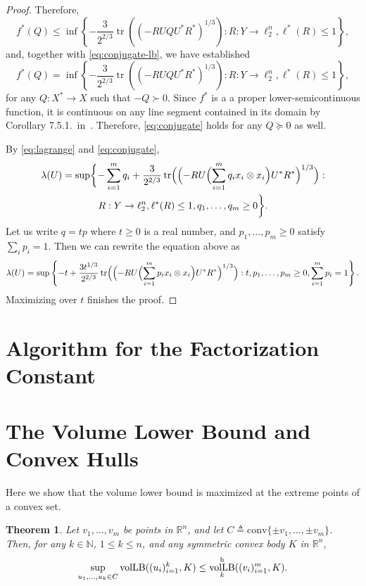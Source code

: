 \documentclass[11pt]{article}
\newtheorem{theorem}{Theorem}
\newcommand{\R}{{\mathbb{R}}}
\newcommand{\eqdef}{\triangleq}
\DeclareMathOperator{\vollb}{volLB}
\DeclareMathOperator{\tr}{tr}
\begin{document}
\begin{proof}
  Therefore,
  \[
    f^*(Q) \le
    \inf\left\{ -\frac{3}{2^{2/3}} \tr((-RUQU^*R^*)^{1/3}):
    R:Y \to \ell_2^n,\ell^*(R) \le 1\right\},
  \]
  and, together with \eqref{eq:conjugate-lb}, we have established 
  \begin{equation}
    \label{eq:conjugate}
    f^*(Q) =
    \inf\left\{ -\frac{3}{2^{2/3}} \tr((-RUQU^*R^*)^{1/3}):
    R:Y \to \ell_2^n,\ell^*(R) \le 1\right\},
  \end{equation}
  for any $Q:X^*\to X$ such that $-Q \succ 0$. Since $f^*$ is a
  a proper lower-semicontinuous function, it is continuous on any
  line segment contained in its domain by Corollary
  7.5.1.~in~\cite{Rockafellar}. Therefore, \eqref{eq:conjugate}
  holds for any $Q \succeq 0$ as well. 
  
  By \eqref{eq:lagrange} and \eqref{eq:conjugate}, 
  \begin{multline}
  \lambda(U) = 
  \sup \biggl\{-\sum_{i = 1}^m{q_i} 
  + \frac{3}{2^{2/3}} \tr\Bigl(\Bigl(-RU\Bigl(\sum_{i = 1}^m{q_i  x_i\otimes  x_i}\Bigr)U^*R^*\Bigr)^{1/3}\Bigr):\\
  R:Y \to \ell_2^n,\ell^*(R) \le 1,
  q_1, \ldots, q_m \ge 0\biggr\}.
  \end{multline}
  Let us write $q = tp$ where $t \ge 0$ is a real number, and $p_1,
  \ldots, p_m \ge 0$ satisfy $\sum_i p_i = 1$. Then we can rewrite the
  equation above as
  \[
  \lambda(U) = 
  \sup\left\{-t + 
    \frac{3t^{1/3}}{2^{2/3}} \tr\Bigl(\Bigl(-RU\Bigl(\sum_{i = 1}^m{p_i  x_i\otimes x_i}\Bigr)U^*R^*\Bigr)^{1/3}\Bigr):
    t, p_1, \ldots, p_m \ge 0, \sum_{i=1}^m p_i = 1\right\}.
  \]
  Maximizing over $t$ finishes the proof. 
\end{proof}

\section{Algorithm for the Factorization Constant}
\label{sect:fact-alg}


\section{The Volume Lower Bound and Convex Hulls}
\label{sec:conv-hulls}

Here we show that the volume lower bound is maximized at the extreme
points of a convex set.

\begin{theorem}\label{thm:conv-hull}
  Let $v_1, \ldots, v_m$ be points in $\R^n$, and let $C \eqdef
  \mathrm{conv}\{\pm v_1, \ldots, \pm v_m\}$. Then, for any $k \in
  \mathbb{N}$, $1 \le k \le n$, and any symmetric convex body $K$ in
  $\R^n$,
  \[
  \sup_{u_1, \ldots, u_k \in C}\vollb((u_i)_{i = 1}^k, K)
  \le
  \vollb^{\rm h}_k((v_i)_{i = 1}^m, K).
  \]
\end{theorem}
\end{document}
